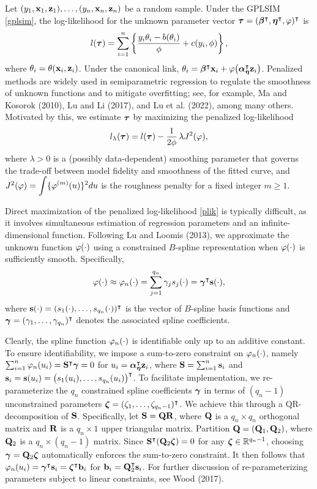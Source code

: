 Let $(y_1,\mathbf{x}_1,\mathbf{z}_1),\ldots,(y_n,\mathbf{x}_n,\mathbf{z}_n)$ be a random sample. Under the GPLSIM \eqref{gplsim}, the log-likelihood for the unknown parameter {\y vector} $\bm\tau = (\bm\beta^\intercal,\bm\eta^\intercal,\varphi)^\intercal$ is
$$
l(\bm\tau)
=
\sum_{i=1}^n \left\{\frac{y_i\theta_i - b(\theta_i)}{\phi} + c(y_i,\phi)\right\},
$$
where $\theta_i = \theta(\mathbf{x}_i,\mathbf{z}_i)$. Under the canonical link, $\theta_i = \bm\beta^\intercal\mathbf{x}_i + \varphi\big(\bm\alpha_{\bm\eta}^\intercal\mathbf{z}_i\big)$. Penalized methods are widely used in semiparametric regression to regulate the smoothness of unknown functions and to mitigate overfitting; see, for example, Ma and Kosorok (2010), Lu and Li (2017), and Lu et al. (2022), among many others. Motivated by this, we estimate $\bm\tau$ by maximizing the penalized log-likelihood
\begin{equation}
	l_\lambda(\bm\tau) = l(\bm\tau) - \frac{1}{2\phi}\,\lambda J^2(\varphi), \label{plik}
\end{equation}
where $\lambda>0$ is a (possibly data-dependent) smoothing parameter that governs the trade-off between model fidelity and smoothness of the fitted curve, and
$
J^2(\varphi) = \displaystyle\int \{\varphi^{(m)}(u)\}^2du
$
is the roughness penalty for a fixed integer $m\ge 1$. 

Direct maximization of the penalized log-likelihood \eqref{plik} is typically difficult, as it involves simultaneous estimation of regression parameters and an infinite-dimensional function. Following Lu and Loomis (2013), we approximate the {\y unknown} function $\varphi(\cdot)$ using a constrained $B$-spline representation when $\varphi(\cdot)$ is sufficiently smooth. Specifically,
$$
\varphi(\cdot) \approx \varphi_n(\cdot)
=
\sum_{j=1}^{q_n}\gamma_j s_j(\cdot)
=
\bm\gamma^\intercal\mathbf{s}(\cdot),
$$
where $\mathbf{s}(\cdot) = (s_1(\cdot),\ldots,s_{q_n}(\cdot))^\intercal$ is the vector of $B$-spline basis functions and $\bm\gamma = (\gamma_1,\ldots,\gamma_{q_n})^\intercal$ denotes the associated spline coefficients.


Clearly, the spline function $\varphi_n(\cdot)$ is identifiable only up to an additive constant. To ensure identifiability, we impose a sum-to-zero constraint on $\varphi_n(\cdot)$, namely $\sum_{i=1}^n \varphi_n(u_i) = \mathbf{S}^\intercal\bm\gamma = 0$ for $u_i = \bm\alpha_{\bm\eta}^\intercal\mathbf{z}_i$, where $\mathbf{S} = \sum_{i=1}^n \mathbf{s}_i$ and $\mathbf{s}_i = \mathbf{s}(u_i) = \big(s_1(u_i),\ldots,s_{q_n}(u_i)\big)^\intercal$. To facilitate implementation, we re-parameterize the $q_n$ constrained spline coefficients $\bm\gamma$ in terms of $(q_n-1)$ unconstrained parameters $\bm\zeta = (\zeta_1,\ldots,\zeta_{q_n-1})^\intercal$. We achieve this through a QR-decomposition of $\mathbf{S}$. {\y Specifically}, let $\mathbf{S} = \mathbf{Q}\mathbf{R}$, where $\mathbf{Q}$ is a $q_n\times q_n$ orthogonal matrix and $\mathbf{R}$ is a $q_n\times 1$ upper triangular matrix. Partition $\mathbf{Q} = (\mathbf{Q}_1,\mathbf{Q}_2)$, where $\mathbf{Q}_2$ is a $q_n\times(q_n-1)$ matrix. Since $\mathbf{S}^\intercal(\mathbf{Q}_2\bm\zeta) = 0$ for any $\bm\zeta\in\mathbb{R}^{q_n-1}$, choosing $\bm\gamma = \mathbf{Q}_2\bm\zeta$ automatically enforces the sum-to-zero constraint. It then follows that $\varphi_n(u_i) = \bm\gamma^\intercal\mathbf{s}_i = \bm\zeta^\intercal\mathbf{b}_i$ for $\mathbf{b}_i = \mathbf{Q}_2^\intercal\mathbf{s}_i$. For further discussion of re-parameterizing parameters subject to linear constraints, see Wood (2017).

